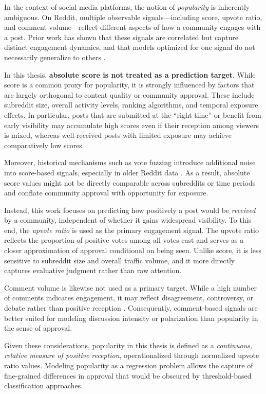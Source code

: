 In the context of social media platforms, the notion of \emph{popularity} is inherently ambiguous. On Reddit, multiple observable signals---including score, upvote ratio, and comment volume---reflect different aspects of how a community engages with a post. Prior work has shown that these signals are correlated but capture distinct engagement dynamics, and that models optimized for one signal do not necessarily generalize to others \cite{hessel2019something,stoddard2015popularity}.

In this thesis, \textbf{absolute score is not treated as a prediction target}. While score is a common proxy for popularity, it is strongly influenced by factors that are largely orthogonal to content quality or community approval. These include subreddit size, overall activity levels, ranking algorithms, and temporal exposure effects. In particular, posts that are submitted at the ``right time'' or benefit from early visibility may accumulate high scores even if their reception among viewers is mixed, whereas well-received posts with limited exposure may achieve comparatively low scores.

Moreover, historical mechanisms such as vote fuzzing introduce additional noise into score-based signals, especially in older Reddit data \cite{stoddard2015popularity}. As a result, absolute score values might not be directly comparable across subreddits or time periods and conflate community approval with opportunity for exposure.

Instead, this work focuses on predicting how positively a post would be \emph{received} by a community, independent of whether it gains widespread visibility. To this end, the \emph{upvote ratio} is used as the primary engagement signal. The upvote ratio reflects the proportion of positive votes among all votes cast and serves as a closer approximation of approval conditional on being seen. Unlike score, it is less sensitive to subreddit size and overall traffic volume, and it more directly captures evaluative judgment rather than raw attention.

Comment volume is likewise not used as a primary target. While a high number of comments indicates engagement, it may reflect disagreement, controversy, or debate rather than positive reception \cite{hessel2019something}. Consequently, comment-based signals are better suited for modeling discussion intensity or polarization than popularity in the sense of approval.

Given these considerations, popularity in this thesis is defined as a \emph{continuous, relative measure of positive reception}, operationalized through normalized upvote ratio values. Modeling popularity as a regression problem allows the capture of fine-grained differences in approval that would be obscured by threshold-based classification approaches.

